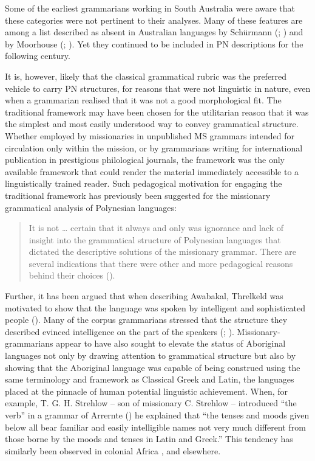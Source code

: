 Some of the earliest grammarians working in South Australia were aware that these categories were not pertinent to their analyses. Many of these features are among a list described as absent in Australian languages by Schürmann (\citeyear[250--251]{schurmann_aboriginal_1846}; ) and by Moorhouse (\citeyear{moorhouse_vocabulary_1846}; ). Yet they continued to be included in PN descriptions for the following century.

It is, however, likely that the classical grammatical rubric was the preferred vehicle to carry PN structures, for reasons that were not linguistic in nature, even when a grammarian realised that it was not a good morphological fit. The traditional framework may have been chosen for the utilitarian reason that it was the simplest and most easily understood way to convey grammatical structure. Whether employed by missionaries in unpublished MS grammars intended for circulation only within the mission, or by grammarians writing for international publication in prestigious philological journals, the framework was the only available framework that could render the material immediately accessible to a linguistically trained reader. Such pedagogical motivation for engaging the traditional framework has previously been suggested for the missionary grammatical analysis of Polynesian languages: 
\begin{quote}
    It is not … certain that it always and only was ignorance and lack of insight into the grammatical structure of Polynesian languages that dictated the descriptive solutions of the missionary grammar. There are several indications that there were other and more pedagogical reasons behind their choices (\citealt[109]{hovdhaugen_beginning_1993}). 
\end{quote}

Further, it has been argued that when describing Awabakal, Threlkeld was motivated to show that the language was spoken by intelligent and sophisticated people (\citealt{roberts_language_2008}). Many of the corpus grammarians stressed that the structure they described evinced intelligence on the part of the speakers (\citealt[iv]{teichelmann_outlines_1840}; \citealt[24]{kempe_grammar_1891}). Missionary-grammarians appear to have also sought to elevate the status of Aboriginal languages not only by drawing attention to grammatical structure but also by showing that the Aboriginal language was capable of being construed using the same terminology and framework as Classical Greek and Latin, the languages placed at the pinnacle of human potential linguistic achievement. When, for example, T. G. H. Strehlow – son of missionary C. Strehlow – introduced “the verb” in a grammar of Arrernte (\citeyear{strehlow_aranda_1944}) he explained that “the tenses and moods given below all bear familiar and easily intelligible names not very much different from those borne by the moods and tenses in Latin and Greek.” This tendency has similarly been observed in colonial Africa \citep{gilmour_grammars_2006}, and elsewhere.

